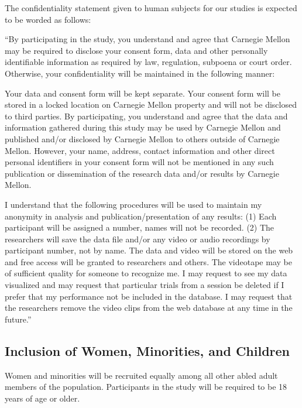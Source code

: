 The confidentiality statement given to human subjects for our studies
is expected to be worded as follows:

``By participating in the study, you understand and agree that
Carnegie Mellon may be required to disclose your consent form, data
and other personally identifiable information as required by law,
regulation, subpoena or court order. Otherwise, your confidentiality
will be maintained in the following manner: 

Your data and consent form will be kept separate. Your consent form
will be stored in a locked location on Carnegie Mellon property and
will not be disclosed to third parties. By participating, you
understand and agree that the data and information gathered during
this study may be used by Carnegie Mellon and published and/or
disclosed by Carnegie Mellon to others outside of Carnegie
Mellon. However, your name, address, contact information and other
direct personal identifiers in your consent form will not be mentioned
in any such publication or dissemination of the research data and/or
results by Carnegie Mellon.

I understand that the following procedures will be used to maintain my
anonymity in analysis and publication/presentation of any results: (1)
Each participant will be assigned a number, names will not be
recorded. (2) The researchers will save the data file and/or any video
or audio recordings by participant number, not by name. The data and
video will be stored on the web and free access will be granted to
researchers and others. The videotape may be of sufficient quality for
someone to recognize me. I may request to see my data visualized and
may request that particular trials from a session be deleted if I
prefer that my performance not be included in the database. I may
request that the researchers remove the video clips from the web
database at any time in the future.''

\subsection*{Inclusion of Women, Minorities, and Children}

Women and minorities will be recruited equally among all other abled
adult members of the population.   Participants in the study will be
required to be 18 years of age or older.
